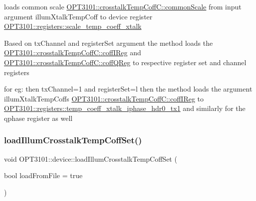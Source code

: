 \begin{DoxyItemize}
\item loads common scale \mbox{\hyperlink{class_o_p_t3101_1_1crosstalk_temp_coff_c_a0ff621323b7f23672af224efca88e01e}{O\+P\+T3101\+::crosstalk\+Temp\+Coff\+C\+::common\+Scale}} from input argument illum\+Xtalk\+Temp\+Coff to device register \mbox{\hyperlink{class_o_p_t3101_1_1registers_a056d6a7717acab1d8915fc3977c0d130}{O\+P\+T3101\+::registers\+::scale\+\_\+temp\+\_\+coeff\+\_\+xtalk}}
\item Based on tx\+Channel and register\+Set argument the method loads the \mbox{\hyperlink{class_o_p_t3101_1_1crosstalk_temp_coff_c_a28ab8d4219f159782b1af029bd876cac}{O\+P\+T3101\+::crosstalk\+Temp\+Coff\+C\+::coff\+I\+Reg}} and \mbox{\hyperlink{class_o_p_t3101_1_1crosstalk_temp_coff_c_ae45f7932044d4d343f5f4d17ef0264c8}{O\+P\+T3101\+::crosstalk\+Temp\+Coff\+C\+::coff\+Q\+Reg}} to respective register set and channel registers ~\newline

\item for eg\+: then tx\+Channel=1 and register\+Set=\textquotesingle{}l\textquotesingle{} then the method loads the argument illum\+Xtalk\+Temp\+Coff\textquotesingle{}s \mbox{\hyperlink{class_o_p_t3101_1_1crosstalk_temp_coff_c_a28ab8d4219f159782b1af029bd876cac}{O\+P\+T3101\+::crosstalk\+Temp\+Coff\+C\+::coff\+I\+Reg}} to \mbox{\hyperlink{class_o_p_t3101_1_1registers_a2dff104599587cc06b51acc7dbf06270}{O\+P\+T3101\+::registers\+::temp\+\_\+coeff\+\_\+xtalk\+\_\+iphase\+\_\+hdr0\+\_\+tx1}} and similarly for the qphase register as well 
\end{DoxyItemize}\mbox{\label{class_o_p_t3101_1_1device_ab384cacd80cd32643b7029fe59428e92}} 
\subsubsection{\texorpdfstring{load\+Illum\+Crosstalk\+Temp\+Coff\+Set()}{loadIllumCrosstalkTempCoffSet()}}
{\footnotesize\ttfamily void O\+P\+T3101\+::device\+::load\+Illum\+Crosstalk\+Temp\+Coff\+Set (\begin{DoxyParamCaption}\item[{bool}]{load\+From\+File = {\ttfamily true} }\end{DoxyParamCaption})}



